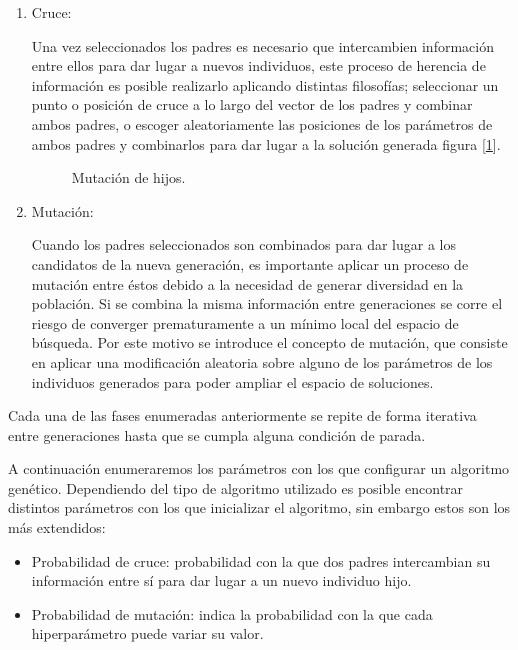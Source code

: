 \begin{enumerate}
                \item Cruce:

                        Una vez seleccionados los padres es necesario que intercambien información entre ellos para dar lugar a nuevos individuos, este proceso de herencia de información es posible realizarlo aplicando distintas filosofías; seleccionar un punto o posición de cruce a lo largo del vector de los padres y combinar ambos padres, o escoger aleatoriamente las posiciones de los parámetros de ambos padres y combinarlos para dar lugar a la solución generada figura [\ref{ParentsMatingMutationImage}].

                        \begin{figure}[h]
                            \centering
                            
                            \caption{Mutación de hijos.}
                            \label{ParentsMatingMutationImage}
                        \end{figure}

                \item Mutación:

                        Cuando los padres seleccionados son combinados para dar lugar a los candidatos de la nueva generación, es importante aplicar un proceso de mutación entre éstos debido a la necesidad de generar diversidad en la población. Si se combina la misma información entre generaciones se corre el riesgo de converger prematuramente a un mínimo local del espacio de búsqueda. Por este motivo se introduce el concepto de mutación, que consiste en aplicar una modificación aleatoria sobre alguno de los parámetros de los individuos generados para poder ampliar el espacio de soluciones. 
            \end{enumerate}

            Cada una de las fases enumeradas anteriormente se repite de forma iterativa entre generaciones hasta que se cumpla alguna condición de parada.


            A continuación enumeraremos los parámetros con los que configurar un algoritmo genético. Dependiendo del tipo de algoritmo utilizado es posible encontrar distintos parámetros con los que inicializar el algoritmo, sin embargo estos son los más extendidos:


            \begin{itemize}


                \item Probabilidad de cruce: probabilidad con la que dos padres intercambian su información entre sí para dar lugar a un nuevo individuo hijo.

                \item Probabilidad de mutación: indica la probabilidad con la que cada hiperparámetro puede variar su valor.

            \end{itemize}


